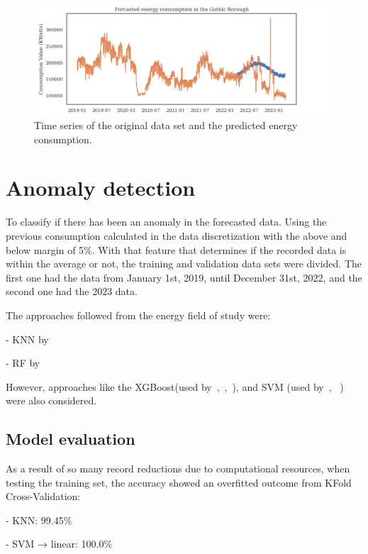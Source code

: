 \documentclass[a4paper,12pt,twoside]{ThesisStyle}
\begin{document}
\begin{figure}[hbt]
\centering
\includegraphics[width=13 cm]{imatges/energy_bcn_8002_forecasted.png}
\caption{\label{fig:energy_bcn_8002_forecasted} Time series of the original data set and the predicted energy consumption.}
\end{figure}

\section{Anomaly detection}

To classify if there has been an anomaly in the forecasted data. Using the previous consumption calculated in the data discretization with the above and below margin of 5\%. With that feature that determines if the recorded data is within the average or not, the training and validation data sets were divided. The first one had the data from January 1st, 2019, until December 31st, 2022, and the second one had the 2023 data.

The approaches followed from the energy field of study were: 

- KNN by~\cite{himeur2020data}

- RF by~\cite{cerquitelli2017predicting}

However, approaches like the XGBoost(used by~\cite{Wang2021CAN},~\cite{karanfilovska2022analysis},~\cite{saheed2022machine}), and SVM (used by~\cite{Wang2017Taxis},~\cite{Nugraha2021rail } ) were also considered.

\subsection{Model evaluation}

As a result of so many record reductions due to computational resources, when testing the training set, the accuracy showed an overfitted outcome from KFold Cross-Validation:

- KNN: 99.45\%

- SVM → linear: 100.0\%
\end{document}
